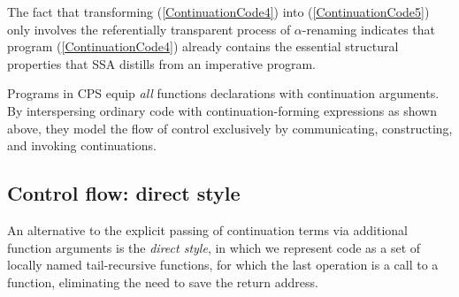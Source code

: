 { The fact that transforming (\ref{ContinuationCode4}) into
(\ref{ContinuationCode5}) only involves the referentially transparent
process of $\alpha$-renaming indicates that program
(\ref{ContinuationCode4}) already contains the essential structural
properties that SSA distills from an imperative program.

Programs in CPS equip \emph{all} functions declarations with
continuation arguments. By interspersing ordinary code with
continuation-forming expressions as shown above, they model the flow
of control exclusively by communicating, constructing, and invoking
continuations.



\subsection{Control flow: direct style}
\label{section:Part1:Semantics:DirectStyle}
An alternative to the explicit passing of continuation terms via
additional function arguments is the \emph{direct style}, 
in which we represent code as a set of locally
named tail-recursive functions, for which the last 
operation is a call to a function, eliminating the need to save the return 
address.

}
